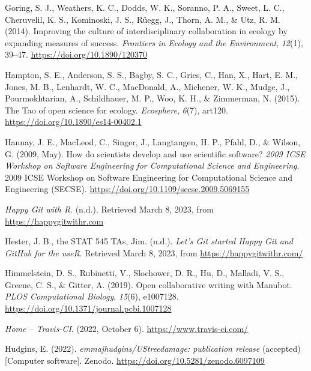 \begin{CSLReferences}{1}{0}
\leavevmode{}%
Goring, S. J., Weathers, K. C., Dodds, W. K., Soranno, P. A., Sweet, L. C., Cheruvelil, K. S., Kominoski, J. S., Rüegg, J., Thorn, A. M., \& Utz, R. M. (2014). Improving the culture of interdisciplinary collaboration in ecology by expanding measures of success. \emph{Frontiers in Ecology and the Environment}, \emph{12}(1), 39--47. \url{https://doi.org/10.1890/120370}

\leavevmode{}%
Hampton, S. E., Anderson, S. S., Bagby, S. C., Gries, C., Han, X., Hart, E. M., Jones, M. B., Lenhardt, W. C., MacDonald, A., Michener, W. K., Mudge, J., Pourmokhtarian, A., Schildhauer, M. P., Woo, K. H., \& Zimmerman, N. (2015). The Tao of open science for ecology. \emph{Ecosphere}, \emph{6}(7), art120. \url{https://doi.org/10.1890/es14-00402.1}

\leavevmode{}%
Hannay, J. E., MacLeod, C., Singer, J., Langtangen, H. P., Pfahl, D., \& Wilson, G. (2009, May). How do scientists develop and use scientific software? \emph{2009 ICSE Workshop on Software Engineering for Computational Science and Engineering}. 2009 ICSE Workshop on Software Engineering for Computational Science and Engineering (SECSE). \url{https://doi.org/10.1109/secse.2009.5069155}

\leavevmode{}%
\emph{Happy Git with R}. (n.d.). Retrieved March 8, 2023, from \url{https://happygitwithr.com}

\leavevmode{}%
Hester, J. B., the STAT 545 TAs, Jim. (n.d.). \emph{Let's Git started \textbar{} Happy Git and GitHub for the useR}. Retrieved March 8, 2023, from \url{https://happygitwithr.com/}

\leavevmode{}%
Himmelstein, D. S., Rubinetti, V., Slochower, D. R., Hu, D., Malladi, V. S., Greene, C. S., \& Gitter, A. (2019). Open collaborative writing with Manubot. \emph{PLOS Computational Biology}, \emph{15}(6), e1007128. \url{https://doi.org/10.1371/journal.pcbi.1007128}

\leavevmode{}%
\emph{Home -- Travis-CI}. (2022, October 6). \url{https://www.travis-ci.com/}

\leavevmode{}%
Hudgins, E. (2022). \emph{emmajhudgins/UStreedamage: publication release} (accepted) {[}Computer software{]}. Zenodo. \url{https://doi.org/10.5281/zenodo.6097109}


\end{CSLReferences}
